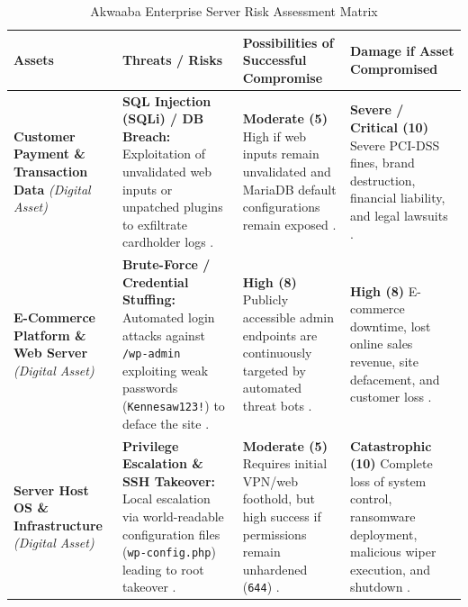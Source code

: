 \documentclass[10pt,a4paper]{article}
\begin{document}
\begin{table}[H]
\centering
\small
\caption{Akwaaba Enterprise Server Risk Assessment Matrix}
\begin{tabular}{|L{3.2cm}|L{4.2cm}|L{4.0cm}|L{4.2cm}|}
\hline
\textbf{Assets} & \textbf{Threats / Risks} & \textbf{Possibilities of Successful Compromise} & \textbf{Damage if Asset Compromised} \\ \hline

\textbf{Customer Payment \& Transaction Data} \newline \textit{(Digital Asset)} & 
\textbf{SQL Injection (SQLi) / DB Breach:} Exploitation of unvalidated web inputs or unpatched plugins to exfiltrate cardholder logs \cite{AkwaabaConfig, RiskSlides}. & 
\textbf{Moderate (5)} \newline High if web inputs remain unvalidated and MariaDB default configurations remain exposed \cite{AkwaabaConfig, RiskSlides}. & 
\textbf{Severe / Critical (10)} \newline Severe PCI-DSS fines, brand destruction, financial liability, and legal lawsuits \cite{Phase1Guide, RiskSlides}. \\ \hline

\textbf{E-Commerce Platform \& Web Server} \newline \textit{(Digital Asset)} & 
\textbf{Brute-Force / Credential Stuffing:} Automated login attacks against \texttt{/wp-admin} exploiting weak passwords (\texttt{Kennesaw123!}) to deface the site \cite{AkwaabaConfig, RiskSlides}. & 
\textbf{High (8)} \newline Publicly accessible admin endpoints are continuously targeted by automated threat bots \cite{RiskSlides, RiskGuide}. & 
\textbf{High (8)} \newline E-commerce downtime, lost online sales revenue, site defacement, and customer loss \cite{Phase1Guide, RiskSlides}. \\ \hline

\textbf{Server Host OS \& Infrastructure} \newline \textit{(Digital Asset)} & 
\textbf{Privilege Escalation \& SSH Takeover:} Local escalation via world-readable configuration files (\texttt{wp-config.php}) leading to root takeover \cite{AkwaabaConfig, RiskSlides}. & 
\textbf{Moderate (5)} \newline Requires initial VPN/web foothold, but high success if permissions remain unhardened (\texttt{644}) \cite{AkwaabaConfig, RiskSlides}. & 
\textbf{Catastrophic (10)} \newline Complete loss of system control, ransomware deployment, malicious wiper execution, and shutdown \cite{Phase1Guide, RiskSlides}. \\ \hline


\end{tabular}
\end{table}
\end{document}
